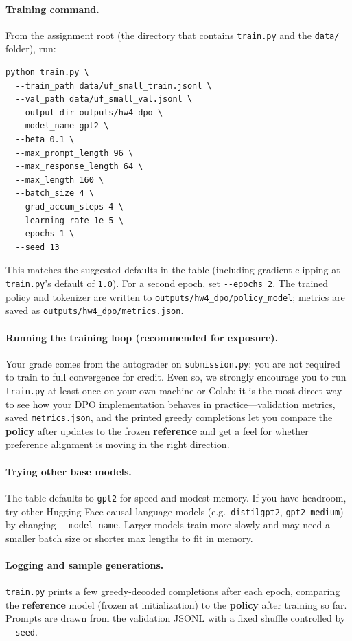 \documentclass[11pt]{article}
\begin{document}
\paragraph{Training command.}
From the assignment root (the directory that contains \texttt{train.py} and the \texttt{data/} folder), run:
\begin{lstlisting}
python train.py \
  --train_path data/uf_small_train.jsonl \
  --val_path data/uf_small_val.jsonl \
  --output_dir outputs/hw4_dpo \
  --model_name gpt2 \
  --beta 0.1 \
  --max_prompt_length 96 \
  --max_response_length 64 \
  --max_length 160 \
  --batch_size 4 \
  --grad_accum_steps 4 \
  --learning_rate 1e-5 \
  --epochs 1 \
  --seed 13
\end{lstlisting}
This matches the suggested defaults in the table (including gradient clipping at \texttt{train.py}'s default of \texttt{1.0}). For a second epoch, set \texttt{-{}-epochs 2}. The trained policy and tokenizer are written to \texttt{outputs/hw4\_dpo/policy\_model}; metrics are saved as \texttt{outputs/hw4\_dpo/metrics.json}.

\paragraph{Running the training loop (recommended for exposure).}
Your grade comes from the autograder on \texttt{submission.py}; you are not required to train to full convergence for credit. Even so, we strongly encourage you to run \texttt{train.py} at least once on your own machine or Colab: it is the most direct way to see how your DPO implementation behaves in practice---validation metrics, saved \texttt{metrics.json}, and the printed greedy completions let you compare the \textbf{policy} after updates to the frozen \textbf{reference} and get a feel for whether preference alignment is moving in the right direction.

\paragraph{Trying other base models.}
The table defaults to \texttt{gpt2} for speed and modest memory. If you have headroom, try other Hugging Face causal language models (e.g.\ \texttt{distilgpt2}, \texttt{gpt2-medium}) by changing \texttt{-{}-model\_name}. Larger models train more slowly and may need a smaller batch size or shorter max lengths to fit in memory.

\paragraph{Logging and sample generations.}
\texttt{train.py} prints a few greedy-decoded completions after each epoch, comparing the \textbf{reference} model (frozen at initialization) to the \textbf{policy} after training so far.
Prompts are drawn from the validation JSONL with a fixed shuffle controlled by \texttt{-{}-seed}.
\end{document}
